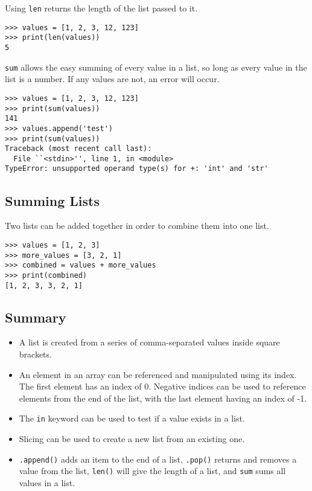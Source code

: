 \documentclass[11pt]{cselabheader}
\begin{document}
Using \lstinline{len} returns the length of the list passed to it.

\begin{lstlisting}[style=ipython]
>>> values = [1, 2, 3, 12, 123]
>>> print(len(values))
5
\end{lstlisting}

\lstinline{sum} allows the easy summing of every value in a list, so long as every value in the list is a number. If any values are not, an error will occur.

\begin{lstlisting}[style=ipython]
>>> values = [1, 2, 3, 12, 123]
>>> print(sum(values))
141
>>> values.append('test')
>>> print(sum(values))
Traceback (most recent call last):
  File ``<stdin>'', line 1, in <module>
TypeError: unsupported operand type(s) for +: 'int' and 'str'
\end{lstlisting}

\subsection{Summing Lists}
Two lists can be added together in order to combine them into one list.

\begin{lstlisting}[style=ipython]
>>> values = [1, 2, 3]
>>> more_values = [3, 2, 1]
>>> combined = values + more_values
>>> print(combined)
[1, 2, 3, 3, 2, 1]
\end{lstlisting}


\subsection{Summary}
\begin{itemize}
  \item A list is created from a series of comma-separated values inside square brackets.
  \item An element in an array can be referenced and manipulated using its index. The first element has an index of 0. Negative indices can be used to reference elements from the end of the list, with the last element having an index of -1.
  \item The \lstinline{in} keyword can be used to test if a value exists in a list.
  \item Slicing can be used to create a new list from an existing one.
  \item \lstinline{.append()} adds an item to the end of a list, \lstinline{.pop()} returns and removes a value from the list, \lstinline{len()} will give the length of a list, and \lstinline{sum} sums all values in a list.
\end{itemize}
\end{document}
